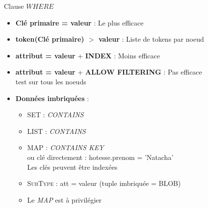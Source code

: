 	
\begin{frame}[fragile]{Clause $WHERE$}
\begin{itemize}
	\item \textbf{Clé primaire = valeur} : Le plus efficace
	\item \textbf{token(Clé primaire) $>$ valeur} : Liste de tokens par noeud
	\item \textbf{attribut = valeur} + \textbf{INDEX} : Moins efficace
	\item \textbf{attribut = valeur} + \textbf{ALLOW FILTERING} : Pas efficace\\test sur tous les noeuds
	\item \textbf{Données imbriquées} :
	\begin{itemize}
		\item \textsc{SET} : \textit{CONTAINS}
		\item \textsc{LIST} : \textit{CONTAINS}
		\item \textsc{MAP} : \textit{CONTAINS KEY}\\ou clé directement : hotesse.prenom = 'Natacha'\\
		Les clés peuvent être indexées
		\item \textsc{SubType} : att = valeur (tuple imbriquée = BLOB)
		\item[$\Rightarrow$] Le \textit{MAP} est à privilégier
	\end{itemize}
\end{itemize}
\end{frame}

